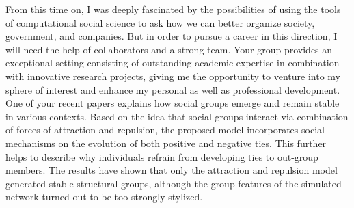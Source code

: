 From this time on, I was deeply fascinated by the possibilities of using the tools of computational social science to ask how we can better organize society, government, and companies. 
But in order to pursue a career in this direction, I will need the help of collaborators and a strong team. 
Your group provides an exceptional setting consisting of outstanding academic expertise in combination with innovative research projects, giving me the opportunity to venture into my sphere of interest and enhance my personal as well as professional development.
One of your recent papers \cite{stadtfeld2020emergence} explains how social groups emerge and remain stable in various contexts.
Based on the idea that social groups interact via combination of forces of attraction and repulsion, the proposed model incorporates social mechanisms on the evolution of both positive and negative ties.
This further helps to describe why individuals refrain from developing ties to out-group members.
The results have shown that only the attraction and repulsion model generated stable structural groups, although the group features of the simulated network turned out to be too strongly stylized.\\


